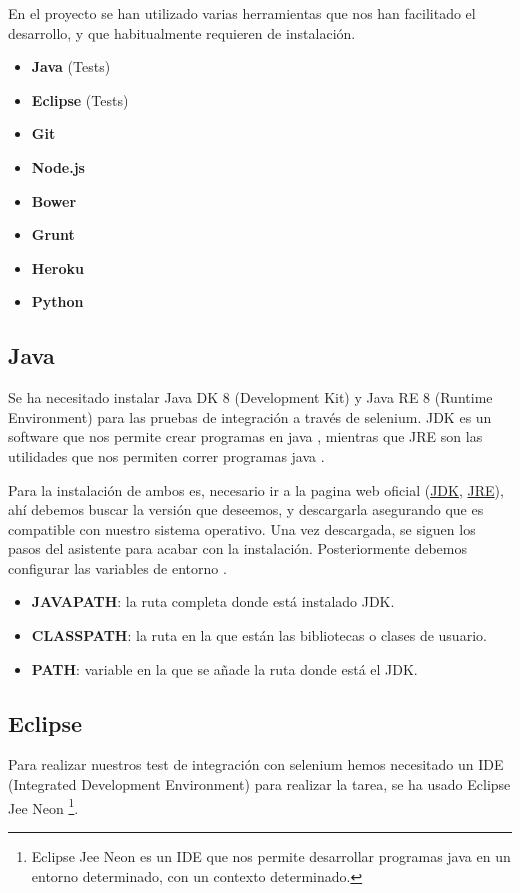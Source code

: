 En el proyecto se han utilizado varias herramientas que nos han facilitado el desarrollo, y que habitualmente requieren de instalación.

\begin{itemize}
	\item \textbf{Java} (Tests)
	\item \textbf{Eclipse} (Tests)
	\item \textbf{Git}
	\item \textbf{Node.js}
	\item \textbf{Bower}
	\item \textbf{Grunt}
	\item \textbf{Heroku}
	\item \textbf{Python}
\end{itemize}

\subsection{Java}

Se ha necesitado instalar Java DK 8 (Development Kit) y Java RE 8 (Runtime Environment) para las pruebas de integración a través de selenium. JDK es un software que nos permite crear programas en java \cite{jdkbib}, mientras que JRE son las utilidades que nos permiten correr programas java \cite{jrebib}.

Para la instalación de ambos es, necesario ir a la pagina web oficial (\href{http://www.oracle.com/technetwork/java/javase/downloads/jdk8-downloads-2133151.html}{JDK}, \href{http://www.oracle.com/technetwork/java/javase/downloads/jre8-downloads-2133155.html}{JRE}), ahí debemos buscar la versión que deseemos, y descargarla asegurando que es compatible con nuestro sistema operativo. Una vez descargada, se siguen los pasos del asistente para acabar con la instalación. Posteriormente debemos configurar las variables de entorno \cite{jdkbib}.

\begin{itemize}
	\item \textbf{JAVAPATH}: la ruta completa donde está instalado JDK.
	\item \textbf{CLASSPATH}: la ruta en la que están las bibliotecas o clases de usuario.
	\item \textbf{PATH}: variable en la que se añade la ruta donde está el JDK.
\end{itemize}


\subsection{Eclipse}
 Para realizar nuestros test de integración con selenium hemos necesitado un IDE (Integrated Development Environment) para realizar la tarea, se ha usado Eclipse Jee Neon \footnote{Eclipse Jee Neon es un IDE que nos permite desarrollar programas java en un entorno determinado, con un contexto determinado.}.
 
